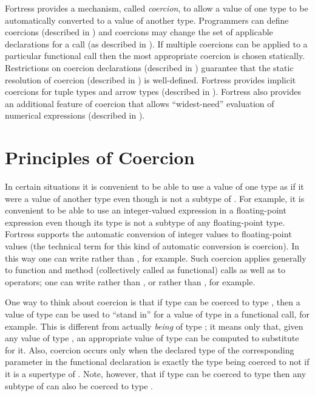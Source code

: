 Fortress provides a mechanism, called \emph{coercion}, to allow a
value of one type to be automatically converted to a value of another
type.  Programmers can define coercions (described in
) and coercions may change the set of
applicable declarations for a call (as described in
).  If multiple coercions can be
applied to a particular functional call then the most appropriate
coercion is chosen statically.  Restrictions on coercion declarations
(described in ) guarantee that the
static resolution of coercion (described in
) is well-defined.  Fortress provides
implicit coercions for tuple types and arrow types (described in
).  Fortress also provides an additional
feature of coercion that allows ``widest-need'' evaluation of
numerical expressions (described in ).

\section{Principles of Coercion}

In certain situations it is convenient to be able to use a value of
one type  as if it were a value of another type  even
though  is not a subtype of .  For example, it is
convenient to be able to use an integer-valued expression
in a floating-point expression even though its
type is not a subtype of any floating-point type.  Fortress supports
the automatic conversion of integer values to floating-point values (the
technical term for this kind of automatic conversion is coercion).  In
this way one can write  rather than , for example.  Such coercion applies generally to function
and method (collectively called as functional) calls as well as to
operators; one can write  rather than , or
 rather than , for example.

One way to think about coercion is that if type  can be coerced
to type , then a value of type  can be used to ``stand
in'' for a value of type  in a functional call, for example.  This is
different from actually \emph{being} of type ; it means only
that, given any value of type , an appropriate value of type
 can be computed to substitute for it.  Also, coercion occurs
only when the declared type of the corresponding parameter in the
functional declaration is exactly the type  being coerced to
 not if it is a supertype of .  Note, however, that if type
  can be coerced to type  then any subtype of 
 can also be coerced to type .


